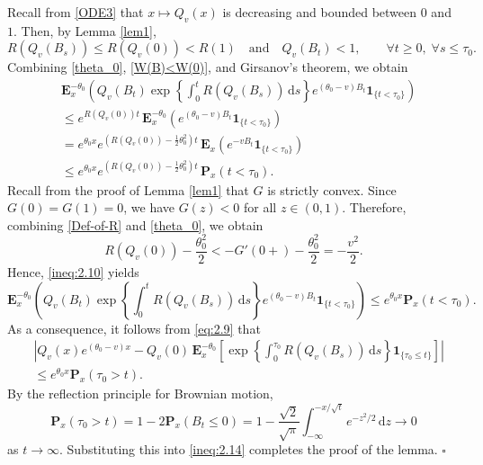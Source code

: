 \documentclass[10pt,a4paper]{amsart}
\numberwithin{equation}{section}
\def\proof{\noindent{\it Proof.~}}
\def\qed{\hfill$\square$\smallskip}
\begin{document}
\proof
Recall from \eqref{ODE3} that $x \mapsto Q_v(x)$ is decreasing and bounded between $0$ and $1$.
Then, by Lemma \ref{lem1},
\begin{equation}\label{W(B)<W(0)}
	R(Q_v(B_s)) \le R(Q_v(0)) < R(1) 
	\quad \text{and} \quad 
	Q_v(B_t) < 1, \qquad \forall t \ge 0, \; \forall s \le \tau_0.
\end{equation}
Combining \eqref{theta_0}, \eqref{W(B)<W(0)}, and Girsanov's theorem, we obtain
\begin{align}\label{ineq:2.10}
	& \mathbf E^{-\theta_0}_x
	\left( Q_v(B_t) \exp\left\{ \int_0^{t} R(Q_v(B_s)) \, \mathrm{d}s \right\} e^{(\theta_0 - v) B_t} \mathbf{1}_{\{t < \tau_0\}} \right) \nonumber \\
	&\le e^{R(Q_v(0)) t} \, \mathbf E^{-\theta_0}_x
	\left( e^{(\theta_0 - v) B_t} \mathbf{1}_{\{t < \tau_0\}} \right) \nonumber \\
	&=
	e^{\theta_0x}
	e^{(R(Q_v(0)) - \frac{1}{2}\theta_0^2) t} \, \mathbf E_x
	\left( e^{-v B_t} \mathbf{1}_{\{t < \tau_0\}} \right) \nonumber \\
	&\le 
	e^{\theta_0x}
	e^{(R(Q_v(0)) - \frac{1}{2}\theta_0^2) t} \, \mathbf P_x(t < \tau_0).
\end{align}
Recall from the proof of Lemma \ref{lem1} that $G$ is strictly convex. Since $G(0) = G(1) = 0$, we have $G(z) < 0$ for all $z \in (0,1)$. Therefore, combining \eqref{Def-of-R} and \eqref{theta_0}, we obtain
\begin{equation}\label{ineq:2.13}
	R(Q_v(0)) - \frac{\theta_0^2}{2} < -G'(0+) - \frac{\theta_0^2}{2} = -\frac{v^2}{2}.
\end{equation}
Hence, \eqref{ineq:2.10} yields
\begin{equation*}
	\mathbf E^{-\theta_0}_x
	\left( Q_v(B_t) \exp\left\{ \int_0^{t} R(Q_v(B_s)) \, \mathrm{d}s \right\} e^{(\theta_0 - v) B_t} \mathbf{1}_{\{t < \tau_0\}} \right)
	\leq 
	e^{\theta_0x}
	\mathbf P_x(t < \tau_0).
\end{equation*}
As a consequence, it follows from \eqref{eq:2.9} that
\begin{align}\label{ineq:2.14}
	& \left| Q_v(x) e^{(\theta_0 - v)x} - Q_v(0) \, \mathbf E^{-\theta_0}_x \left[ \exp\left\{ \int_0^{\tau_0} R(Q_v(B_s)) \, \mathrm{d}s \right\} \mathbf{1}_{\{\tau_0 \leq t\}} \right] \right| \nonumber\\
	&
	\leq 
	e^{\theta_0x}
	\mathbf P_x(\tau_0 > t).
\end{align}
By the reflection principle for Brownian motion,
\[
\mathbf P_x(\tau_0 > t) = 1 - 2 \mathbf P_x(B_t \leq 0)
= 1 - \frac{\sqrt{2}}{\sqrt{\pi}} \int_{-\infty}^{-x/\sqrt{t}} e^{-z^2/2} \, \mathrm{d}z
\to 0
\]
as $t \to \infty$. Substituting this into \eqref{ineq:2.14} completes the proof of the lemma.
\qed
\end{document}
